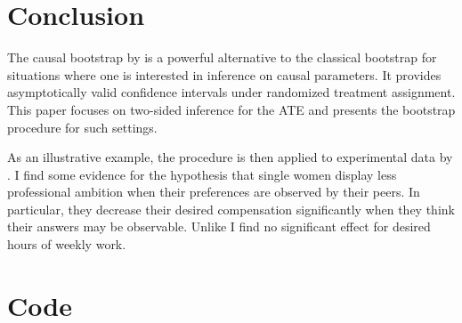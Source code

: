 \documentclass[aodsor,preprint]{imsart}
\numberwithin{equation}{section}
\theoremstyle{plain}
\begin{document}
\section{Conclusion} \label{Conclusion}

The causal bootstrap by \cite{Imbens_2021} is a powerful alternative to the classical bootstrap for situations where one is interested in inference on causal parameters. It provides asymptotically valid confidence intervals under randomized treatment assignment. This paper focuses on two-sided inference for the ATE and presents the bootstrap procedure for such settings.

As an illustrative example, the procedure is then applied to experimental data by \cite{Bursztyn_2017}. I find some evidence for the hypothesis that single women display less professional ambition when their preferences are observed by their peers. In particular, they decrease their desired compensation significantly when they think their answers may be observable. Unlike \cite{Bursztyn_2017} I find no significant effect for desired hours of weekly work. 



\newpage

\appendix
\section{Code} \label{Code}
\end{document}
